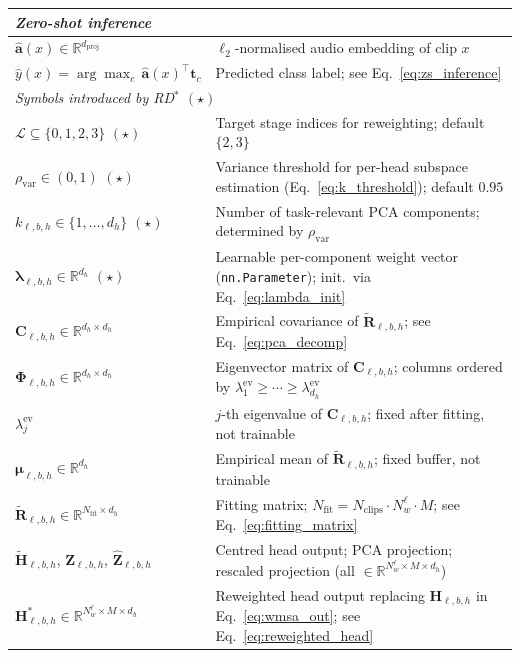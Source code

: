 \begin{table}[h]
\begin{tabularx}{\textwidth}{lX}
\midrule
\multicolumn{2}{l}{\textit{Zero-shot inference}} \\
\midrule
$\hat{\mathbf{a}}(x) \in \mathbb{R}^{d_{\mathrm{proj}}}$ & $\ell_2$-normalised audio embedding of clip $x$ \\
$\hat{y}(x) = \arg\max_c\,\hat{\mathbf{a}}(x)^\top\mathbf{t}_c$ & Predicted class label; see Eq.~\eqref{eq:zs_inference} \\
\midrule
\multicolumn{2}{l}{\textit{Symbols introduced by RD$^*$ $(\star)$}} \\
\midrule
$\mathcal{L} \subseteq \{0,1,2,3\}$ $(\star)$ & Target stage indices for reweighting; default $\{2,3\}$ \\
$\rho_{\mathrm{var}} \in (0,1)$ $(\star)$ & Variance threshold for per-head subspace estimation (Eq.~\eqref{eq:k_threshold}); default $0.95$ \\
$k_{\ell,b,h} \in \{1,\ldots,d_h\}$ $(\star)$ & Number of task-relevant PCA components; determined by $\rho_{\mathrm{var}}$ \\
$\boldsymbol{\lambda}_{\ell,b,h} \in \mathbb{R}^{d_h}$ $(\star)$ & Learnable per-component weight vector (\texttt{nn.Parameter}); init.\ via Eq.~\eqref{eq:lambda_init} \\
$\mathbf{C}_{\ell,b,h} \in \mathbb{R}^{d_h \times d_h}$ & Empirical covariance of $\widetilde{\mathbf{R}}_{\ell,b,h}$; see Eq.~\eqref{eq:pca_decomp} \\
$\boldsymbol{\Phi}_{\ell,b,h} \in \mathbb{R}^{d_h \times d_h}$ & Eigenvector matrix of $\mathbf{C}_{\ell,b,h}$; columns ordered by $\lambda_1^{\mathrm{ev}}\ge\cdots\ge\lambda_{d_h}^{\mathrm{ev}}$ \\
$\lambda^{\mathrm{ev}}_j$ & $j$-th eigenvalue of $\mathbf{C}_{\ell,b,h}$; fixed after fitting, not trainable \\
$\boldsymbol{\mu}_{\ell,b,h} \in \mathbb{R}^{d_h}$ & Empirical mean of $\widetilde{\mathbf{R}}_{\ell,b,h}$; fixed buffer, not trainable \\
$\widetilde{\mathbf{R}}_{\ell,b,h} \in \mathbb{R}^{N_{\mathrm{fit}} \times d_h}$ & Fitting matrix; $N_{\mathrm{fit}} = N_{\mathrm{clips}}\cdot N_w^\ell\cdot M$; see Eq.~\eqref{eq:fitting_matrix} \\
$\widetilde{\mathbf{H}}_{\ell,b,h}$, $\mathbf{Z}_{\ell,b,h}$, $\widehat{\mathbf{Z}}_{\ell,b,h}$ & Centred head output; PCA projection; rescaled projection (all $\in\mathbb{R}^{N_w^\ell\times M\times d_h}$) \\
$\mathbf{H}^*_{\ell,b,h} \in \mathbb{R}^{N_w^\ell \times M \times d_h}$ & Reweighted head output replacing $\mathbf{H}_{\ell,b,h}$ in Eq.~\eqref{eq:wmsa_out}; see Eq.~\eqref{eq:reweighted_head} \\

\end{tabularx}
\end{table}

